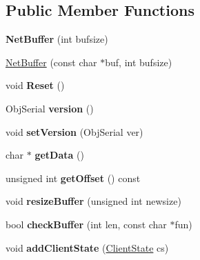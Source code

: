 \subsection*{Public Member Functions}
\begin{DoxyCompactItemize}
\item 
{\bfseries Net\+Buffer} (int bufsize)\hypertarget{classNetBuffer_a5b440891def188415372af6359ec4553}{}\label{classNetBuffer_a5b440891def188415372af6359ec4553}

\item 
\hyperlink{classNetBuffer_a3ca55615a9e66d75c51c81f864cf3703}{Net\+Buffer} (const char $\ast$buf, int bufsize)
\item 
void {\bfseries Reset} ()\hypertarget{classNetBuffer_acc7365ad41b606281438dee5bcbb6f47}{}\label{classNetBuffer_acc7365ad41b606281438dee5bcbb6f47}

\item 
Obj\+Serial {\bfseries version} ()\hypertarget{classNetBuffer_ad52dcc41a6ec3b88c7e7bdcd312fa1e8}{}\label{classNetBuffer_ad52dcc41a6ec3b88c7e7bdcd312fa1e8}

\item 
void {\bfseries set\+Version} (Obj\+Serial ver)\hypertarget{classNetBuffer_a5a1c1d6180a65dbe0f3d4627db528c87}{}\label{classNetBuffer_a5a1c1d6180a65dbe0f3d4627db528c87}

\item 
char $\ast$ {\bfseries get\+Data} ()\hypertarget{classNetBuffer_ac147dd4d44f43cabf3d6d611cafabbee}{}\label{classNetBuffer_ac147dd4d44f43cabf3d6d611cafabbee}

\item 
unsigned int {\bfseries get\+Offset} () const \hypertarget{classNetBuffer_a905a6cde91daa3e7fe58509c714000ce}{}\label{classNetBuffer_a905a6cde91daa3e7fe58509c714000ce}

\item 
void {\bfseries resize\+Buffer} (unsigned int newsize)\hypertarget{classNetBuffer_a84d5ca1c0ca266fa061bc0c70110167f}{}\label{classNetBuffer_a84d5ca1c0ca266fa061bc0c70110167f}

\item 
bool {\bfseries check\+Buffer} (int len, const char $\ast$fun)\hypertarget{classNetBuffer_a648eedc85dbe0fdc1421da1ec702e888}{}\label{classNetBuffer_a648eedc85dbe0fdc1421da1ec702e888}

\item 
void {\bfseries add\+Client\+State} (\hyperlink{classClientState}{Client\+State} cs)\hypertarget{classNetBuffer_a64e6ba4fcbc517c8fd5d444dca082e54}{}\label{classNetBuffer_a64e6ba4fcbc517c8fd5d444dca082e54}


\end{DoxyCompactItemize}
